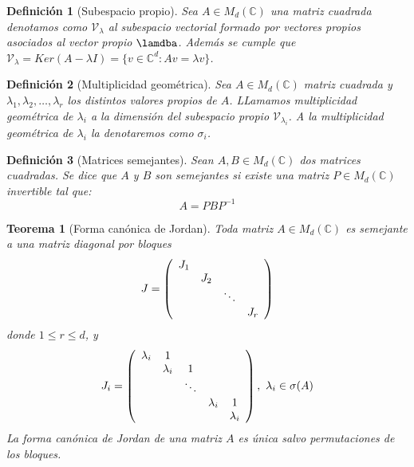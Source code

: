 \documentclass[size=a4, parskip=half, titlepage=false, toc=flat, toc=bib, 12pt]{scrartcl}
\theoremstyle{theorem-style}
\newtheorem{nth}{Teorema}[section]
\theoremstyle{definition-style}
\newtheorem{ndef}{Definición}[section]
\theoremstyle{remark-style}
\theoremstyle{example-style}
\theoremstyle{definition-style}
\theoremstyle{remark-style}
\begin{document}
\begin{ndef}[Subespacio propio]
Sea $A \in M_d(\mathbb{C})$ una matriz cuadrada denotamos como $\mathscr{V}_\lambda$ al subespacio vectorial formado por vectores propios asociados al vector propio $\lamdba$. Además se cumple que  $\mathscr{V}_\lambda = Ker(A - \lambda I) = \{ v \in \mathbb{C}^d : Av = \lambda v \}$.
\end{ndef}

\begin{ndef}[Multiplicidad geométrica]
Sea $A \in M_d(\mathbb{C})$ matriz cuadrada y $\lambda_1, \lambda_2, \dots, \lambda_r$ los distintos valores propios de $A$. LLamamos multiplicidad geométrica de $\lambda_i$ a la dimensión del subespacio propio $\mathscr{V}_\lambda_i$. A la multiplicidad geométrica de $\lambda_i$ la denotaremos como $\sigma_i$.
\end{ndef}

\begin{ndef}[Matrices semejantes]
Sean $A, B \in M_d(\mathbb{C})$ dos matrices cuadradas. Se dice que $A$ y $B$ son semejantes si existe una matriz $P \in M_d(\mathbb{C})$ invertible tal que:
$$A = P B P^{-1} $$
\end{ndef}

\begin{nth}[Forma canónica de Jordan]
Toda matriz $A \in M_d(\mathbb{C})$ es semejante a una matriz diagonal por bloques
$$J = \left(
      \begin{array}{{cccc}}
        J_1   &           &         &     \\
              &    J_2    &         &     \\
              &           & \ddots  &     \\
              &           &         & J_r
      \end{array}
\right)$$
donde $1 \leq r \leq d$, y
$$J_i = \left(
      \begin{array}{{ccccc}}
        \lambda_i   &   1       &         &    & \\
              &    \lambda_i    &    1     &    & \\
              &           & \ddots  &     & \\
              &           &         & \lambda_i & 1 \\
              &           &         &           & \lambda_i
      \end{array}
\right), \ \lambda_i \in \sigma(A)$$
La forma canónica de Jordan de una matriz $A$ es única salvo permutaciones de los bloques.
\end{nth}
\end{document}
